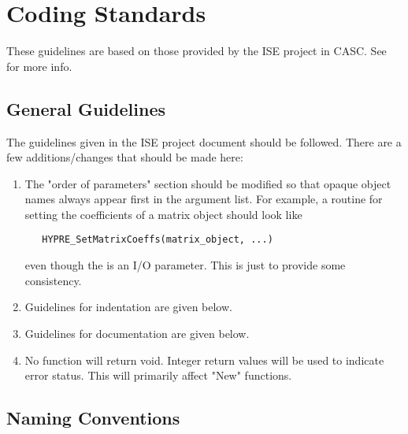 \chapter{Coding Standards}
\label{Coding Standards}

These guidelines are based on those provided by the ISE project in CASC.
See  for more info.

\section{General Guidelines}
\label{General Guidelines}

The guidelines given in the ISE project document 
should be followed.  There are a few additions/changes that should
be made here:
\begin{enumerate}

\item The "order of parameters" section should be modified so that
opaque object names always appear first in the argument list.  For
example, a routine for setting the coefficients of a matrix object
should look like
\begin{verbatim}
   HYPRE_SetMatrixCoeffs(matrix_object, ...)
\end{verbatim}
even though the  is an I/O parameter.  This is just to
provide some consistency.

\item Guidelines for indentation are given below.

\item Guidelines for documentation are given below.

\item No function will return void.  Integer return values will be used
to indicate error status.  This will primarily affect "New" functions.

\end{enumerate}

\section{Naming Conventions}
\label{Naming Conventions}

